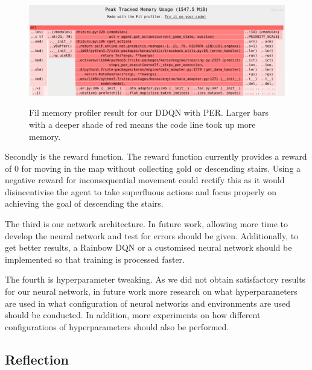 \documentclass[12pt,a4paper]{article}
\begin{document}
    \begin{figure}[h]
        \caption[Fil Profiler result for DDQN with PER.]{Fil memory profiler result for our DDQN with PER. Larger bars with a deeper shade of red means the code line took up more memory.}
        \centering
        \includegraphics[scale=0.3]{fil}
        \label{fig:fil}
    \end{figure}

    Secondly is the reward function.
    The reward function currently provides a reward of 0 for moving in the map without collecting gold or descending stairs.
    Using a negative reward for inconsequential movement could rectify this as it would disincentivise the agent to take
    superfluous actions and focus properly on achieving the goal of descending the stairs.

    The third is our network architecture.
    In future work, allowing more time to develop the neural network and test for errors should be given.
    Additionally, to get better results, a Rainbow DQN or a customised neural network should be implemented so that
    training is processed faster.

    The fourth is hyperparameter tweaking.
    As we did not obtain satisfactory results for our neural network, in future work more research on what hyperparameters
    are used in what configuration of neural networks and environments are used should be conducted.
    In addition, more experiments on how different configurations of hyperparameters should also be performed.

    \subsection{Reflection}\label{subsec:reflection}

\end{document}
